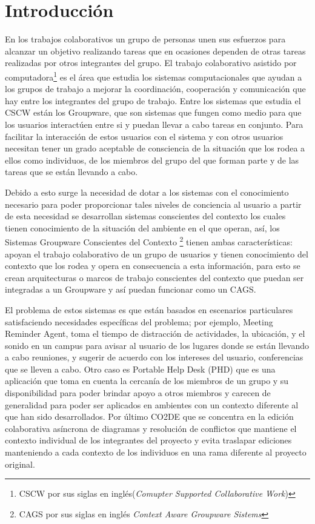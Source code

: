 \section{Introducci\'on}
En los trabajos colaborativos un grupo de personas unen sus esfuerzos para alcanzar un objetivo realizando tareas que en ocasiones dependen de otras tareas realizadas por otros integrantes del grupo. El trabajo colaborativo asistido por computadora\footnote{CSCW por sus siglas en ingl\'es(\textit{Comupter Supported Collaborative Work})} es el \'area que estudia los sistemas computacionales que ayudan a los grupos de trabajo a mejorar la coordinaci\'on, cooperaci\'on y comunicaci\'on que hay entre los integrantes del grupo de trabajo. Entre los sistemas que estudia el CSCW est\'an los Groupware, que son sistemas que fungen como medio para que los usuarios interact\'uen entre si y puedan llevar a cabo tareas en conjunto. Para facilitar la interacci\'on de estos usuarios con el sistema y con otros usuarios necesitan tener un grado aceptable de consciencia de la situaci\'on que los rodea a ellos como individuos, de los miembros del grupo del que forman parte y de las tareas que se est\'an llevando a cabo. 

Debido a esto surge la necesidad de dotar a los sistemas con el conocimiento necesario para poder proporcionar tales niveles de conciencia al usuario a partir de esta necesidad se desarrollan sistemas conscientes del contexto los cuales tienen conocimiento de la situaci\'on del ambiente en el que operan, as\'i, los Sistemas Groupware Conscientes del Contexto \footnote{CAGS por sus siglas en ingl\'es \textit{Context Aware Groupware Sistems}} tienen ambas caracter\'isticas: apoyan el trabajo colaborativo de un grupo de usuarios y tienen conocimiento del contexto que los rodea y opera en consecuencia a esta informaci\'on, para esto se crean arquitecturas o marcos de trabajo conscientes del contexto que puedan ser integradas a un Groupware y as\'i puedan funcionar como un CAGS.

El problema de estos sistemas es que est\'an basados en escenarios particulares satisfaciendo necesidades espec\'ificas del problema; por ejemplo, Meeting Reminder Agent\cite{anhalt2001toward}, toma el tiempo de distracci\'on de actividades, la ubicaci\'on, y el sonido en un campus para avisar al usuario de los lugares donde se est\'an llevando a cabo reuniones, y sugerir de acuerdo con los intereses del usuario, conferencias que se lleven a cabo. Otro caso es Portable Help Desk (PHD) \cite{anhalt2001toward} que es una aplicaci\'on que toma en cuenta la cercan\'ia de los miembros de un grupo y su disponibilidad para poder brindar apoyo a otros miembros y carecen de generalidad para poder ser aplicados en ambientes con un contexto diferente al que han sido desarrollados. Por \'ultimo CO2DE \cite{schmidt1992taking} que se concentra en la edici\'on colaborativa as\'incrona de diagramas y resoluci\'on de conflictos que mantiene el contexto individual de los integrantes del proyecto y evita traslapar ediciones manteniendo a cada contexto de los individuos en una rama diferente al proyecto original.

